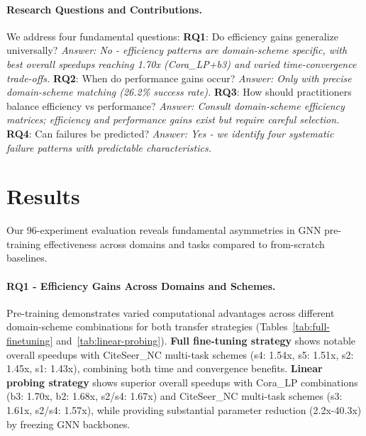 \documentclass[11pt]{article}
\begin{document}
\paragraph{Research Questions and Contributions.} 
We address four fundamental questions:
\textbf{RQ1}: Do efficiency gains generalize universally? \textit{Answer: No - efficiency patterns are domain-scheme specific, with best overall speedups reaching 1.70x (Cora\_LP+b3) and varied time-convergence trade-offs.}
\textbf{RQ2}: When do performance gains occur? \textit{Answer: Only with precise domain-scheme matching (26.2\% success rate).}
\textbf{RQ3}: How should practitioners balance efficiency vs performance? \textit{Answer: Consult domain-scheme efficiency matrices; efficiency and performance gains exist but require careful selection.}
\textbf{RQ4}: Can failures be predicted? \textit{Answer: Yes - we identify four systematic failure patterns with predictable characteristics.}

\section{Results}

Our 96-experiment evaluation reveals fundamental asymmetries in GNN pre-training effectiveness across domains and tasks compared to from-scratch baselines.

\paragraph{RQ1 - Efficiency Gains Across Domains and Schemes.} Pre-training demonstrates varied computational advantages across different domain-scheme combinations for both transfer strategies (Tables~\ref{tab:full-finetuning} and~\ref{tab:linear-probing}). \textbf{Full fine-tuning strategy} shows notable overall speedups with CiteSeer\_NC multi-task schemes (s4: 1.54x, s5: 1.51x, s2: 1.45x, s1: 1.43x), combining both time and convergence benefits. \textbf{Linear probing strategy} shows superior overall speedups with Cora\_LP combinations (b3: 1.70x, b2: 1.68x, s2/s4: 1.67x) and CiteSeer\_NC multi-task schemes (s3: 1.61x, s2/s4: 1.57x), while providing substantial parameter reduction (2.2x-40.3x) by freezing GNN backbones.
\end{document}
